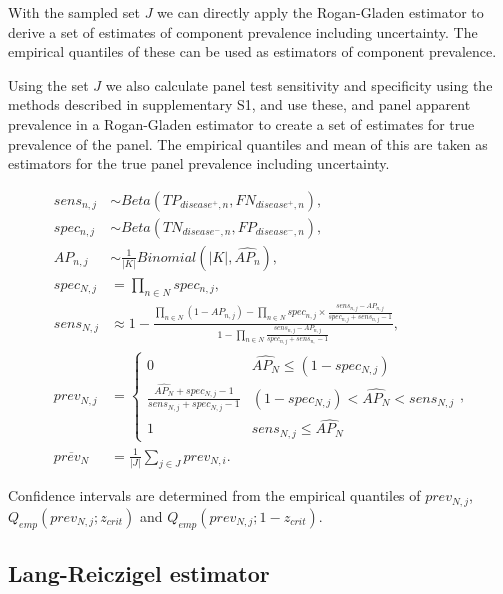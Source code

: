 \documentclass[a4paper, 12pt, twoside]{article}
\let\Oldsubsection\subsection
\renewcommand{\subsection}{\FloatBarrier\Oldsubsection}
\begin{document}
With the sampled set \(J\) we can directly apply the Rogan-Gladen estimator to derive a set of estimates of component prevalence including uncertainty. The empirical quantiles of these can be used as estimators of component prevalence.

Using the set \(J\) we also calculate panel test sensitivity and specificity using the methods described in supplementary S1, and use these, and panel apparent prevalence in a Rogan-Gladen estimator \cite{rogan1978} to create a set of estimates for true prevalence of the panel. The empirical quantiles and mean of this are taken as estimators for the true panel prevalence including uncertainty.

\begin{equation*}
\begin{aligned}
sens_{n,j} &\sim Beta(TP_{disease^+,n}, FN_{disease^+,n}), \\
spec_{n,j} &\sim Beta(TN_{disease^-,n}, FP_{disease^-,n}), \\
AP_{n,j} &\sim \frac{1}{|K|}Binomial(|K|, \widehat{AP_n}), \\
spec_{N,j} &= \prod_{n \in N}{spec_{n,j}}, \\
sens_{N,j} &\approx 1-\frac{
  \prod_{n \in N}{(1-AP_{n,j})} - \prod_{n \in N}{spec_{n,j} \times \frac{sens_{n,j}-AP_{n,j}}{spec_{n,j} + sens_{n,j} - 1}}
}{
  1 - \prod_{n \in N}{ \frac{sens_{n,j}-AP_{n,j}}{spec_{n,j} + sens_{n,} - 1} }
}, \\
prev_{N,j} &= \begin{cases}
    0 & \widehat{AP_N} \le (1-spec_{N,j})\\
    \frac{\widehat{AP_N} + spec_{N,j} -1}{sens_{N,j} + spec_{N,j} - 1} & (1-spec_{N,j}) < \widehat{AP_N} < sens_{N,j}\\
    1 & sens_{N,j} \le \widehat{AP_N}
  \end{cases}, \\
\overline{prev_N} &= \frac{1}{|J|}\sum_{j \in J}{prev_{N,i}}.
\end{aligned}
\end{equation*}

Confidence intervals are determined from the empirical quantiles of \(prev_{N,j}\), \(Q_{emp}(prev_{N,j};z_{crit})\) and \(Q_{emp}(prev_{N,j};1-z_{crit})\).

\subsection{Lang-Reiczigel estimator}
\end{document}
